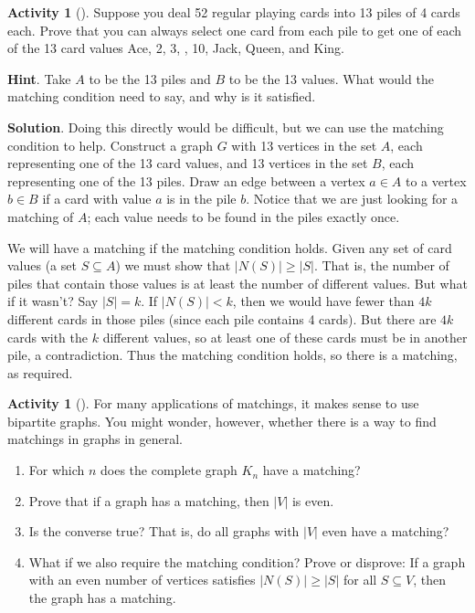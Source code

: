 \documentclass[10pt,]{book}
\theoremstyle{plain}
\theoremstyle{definition}
\theoremstyle{definition}
\theoremstyle{definition}
\newtheorem{activity}[project]{Activity}
\numberwithin{equation}{chapter}
\newcommand{\card}[1]{\left| #1 \right|}
\newcommand{\lt}{<}
\begin{document}
\begin{activity}[]\label{activity-54}
\hypertarget{p-460}{}%
Suppose you deal 52 regular playing cards into 13 piles of 4 cards each. Prove that you can always select one card from each pile to get one of each of the 13 card values Ace, 2, 3, \textellipsis{}, 10, Jack, Queen, and King.%
\par\smallskip%
\noindent\textbf{Hint}.\hypertarget{hint-25}{}\quad%
\hypertarget{p-461}{}%
Take \(A\) to be the 13 piles and \(B\) to be the 13 values.  What would the matching condition need to say, and why is it satisfied.%
\par\smallskip%
\noindent\textbf{Solution}.\hypertarget{solution-36}{}\quad%
\hypertarget{p-462}{}%
Doing this directly would be difficult, but we can use the matching condition to help. Construct a graph \(G\) with 13 vertices in the set \(A\), each representing one of the 13 card values, and 13 vertices in the set \(B\), each representing one of the 13 piles. Draw an edge between a vertex \(a \in A\) to a vertex \(b \in B\) if a card with value \(a\) is in the pile \(b\). Notice that we are just looking for a matching of \(A\); each value needs to be found in the piles exactly once.%
\par
\hypertarget{p-463}{}%
We will have a matching if the matching condition holds. Given any set of card values (a set \(S \subseteq A\)) we must show that \(|N(S)| \ge |S|\). That is, the number of piles that contain those values is at least the number of different values. But what if it wasn't? Say \(|S| = k\). If \(|N(S)| \lt  k\), then we would have fewer than \(4k\) different cards in those piles (since each pile contains 4 cards). But there are \(4k\) cards with the \(k\) different values, so at least one of these cards must be in another pile, a contradiction. Thus the matching condition holds, so there is a matching, as required.%
\end{activity}
\begin{activity}[]\label{activity-55}
\hypertarget{p-464}{}%
For many applications of matchings, it makes sense to use bipartite graphs. You might wonder, however, whether there is a way to find matchings in graphs in general.%
\begin{enumerate}[font=\bfseries,label=(\alph*),ref=\alph*]
\item\label{task-66} \hypertarget{p-465}{}%
For which \(n\) does the complete graph \(K_n\) have a matching?%
\item\label{task-67} \hypertarget{p-466}{}%
Prove that if a graph has a matching, then \(\card{V}\) is even.%
\item\label{task-68} \hypertarget{p-467}{}%
Is the converse true?  That is, do all graphs with \(\card{V}\) even have a matching?%
\item\label{task-69} \hypertarget{p-468}{}%
What if we also require the matching condition?  Prove or disprove: If a graph with an even number of vertices satisfies \(\card{N(S)} \ge \card{S}\) for all \(S \subseteq V\), then the graph has a matching.%
\end{enumerate}
\end{activity}
\typeout{************************************************}
\typeout{************************************************}
\end{document}
